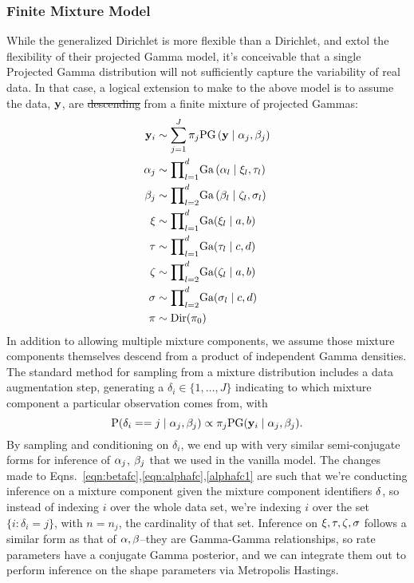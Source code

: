 \subsubsection{Finite Mixture Model}
While the generalized Dirichlet is more flexible than a Dirichlet, and \cite{nunez2019}
  extol the flexibility of their projected Gamma model, it's conceivable that a single Projected Gamma
  distribution will not sufficiently capture the variability of real data.  In that case, a logical
  extension to make to the above model is to assume the data, ${\bf y}$, are \st{descending}  from a finite
  mixture of projected Gammas:
  \begin{equation}
    \label{eqn:fmixp}
    \begin{aligned}
      {\bf y}_i &\sim \sum_{j = 1}^J\pi_j\text{PG}\left({\bf y}\mid {\bf \alpha}_j, {\bf \beta}_j\right)\\
      {\bf \alpha}_j &\sim {\small \prod}_{l = 1}^d \text{Ga}\left(\alpha_l\mid\xi_l,\tau_l\right)\\
      {\bf \beta}_j &\sim {\small \prod}_{l = 2}^d \text{Ga}\left(\beta_l\mid\zeta_l,\sigma_l\right)\\
      {\bf \xi} &\sim {\small \prod}_{l = 1}^d \text{Ga}(\xi_l\mid a,b)\\
      {\bf \tau} &\sim {\small \prod}_{l = 1}^d \text{Ga}(\tau_l\mid c,d)\\
      {\bf \zeta} &\sim {\small\prod}_{l = 2}^d\text{Ga}(\zeta_l \mid a,b)\\
      {\bf \sigma} &\sim {\small\prod}_{l = 2}^d\text{Ga}(\sigma_l\mid c,d)\\
      {\bf \pi} &\sim \text{Dir}(\pi_0)
    \end{aligned}
  \end{equation}
  In addition to allowing multiple mixture components, we assume those mixture components themselves
  descend from a product of independent Gamma densities. The standard method for sampling from a
  mixture distribution includes a data augmentation step, generating a
  $\delta_i \in \lbrace 1,\ldots, J\rbrace$ indicating to which mixture component a
  particular observation comes from, with
  \begin{equation*}
    \text{P}(\delta_i == j\mid\alpha_j,\beta_j) \propto \pi_j\text{PG}({\bf y}_i\mid {\bf \alpha}_j,{\bf \beta}_j).
  \end{equation*}
  By sampling and conditioning on $\delta_i$, we end up with very similar semi-conjugate forms for
  inference of ${\bf \alpha}_j$, ${\bf \beta}_j$ that we used in the vanilla model.  The changes made
  to Eqns.~\ref{eqn:betafc},\ref{eqn:alphafc},\ref{alphafc1} are such that we're conducting inference
  on a mixture component given the mixture component identifiers ${\bf \delta}$, so instead of indexing
  $i$ over the whole data set, we're indexing $i$ over the set $\{i :\delta_i = j\}$, with $n = n_j$,
  the cardinality of that set. Inference on ${\bf \xi,\tau,\zeta,\sigma}$ follows a similar form as
  that of ${\bf \alpha,\beta}$--they are Gamma-Gamma relationships, so rate parameters have a conjugate
  Gamma posterior, and we can integrate them out to perform inference on the shape parameters via
  Metropolis Hastings.

